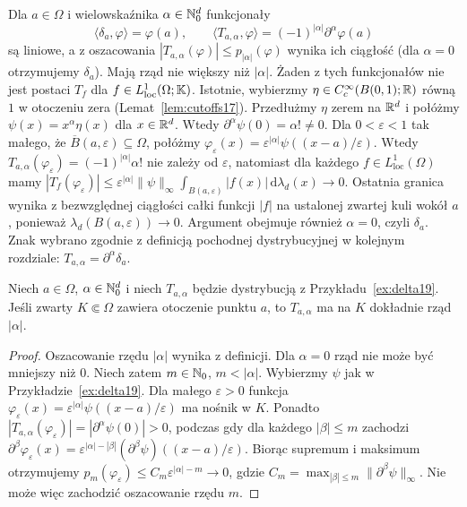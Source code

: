 \begin{przyklad}
\label{ex:delta19}
Dla $a\in\Omega$ i wielowskaźnika $\alpha\in\mathbb N_0^d$
funkcjonały
\[\langle\delta_a,\varphi\rangle=\varphi(a),\qquad
\langle T_{a,\alpha},\varphi\rangle
=(-1)^{|\alpha|}\partial^\alpha\varphi(a)\]
są liniowe, a z oszacowania
$|T_{a,\alpha}(\varphi)|\le p_{|\alpha|}(\varphi)$
wynika ich ciągłość (dla $\alpha=0$ otrzymujemy $\delta_a$).
Mają rząd nie większy niż $|\alpha|$.
Żaden z tych funkcjonałów nie jest postaci $T_f$
dla $f\in L^1_{\mathrm{loc}}(\Omega;\mathbb K)$.
Istotnie, wybierzmy $\eta\in C_c^\infty(B(0,1);\mathbb R)$
równą $1$ w otoczeniu zera (Lemat~\ref{lem:cutoffs17}).
Przedłużmy $\eta$ zerem na $\mathbb R^d$ i połóżmy
$\psi(x)=x^\alpha\eta(x)$ dla $x\in\mathbb R^d$.
Wtedy $\partial^\alpha\psi(0)=\alpha!\ne0$.
Dla $0<\varepsilon<1$ tak małego, że
$\overline B(a,\varepsilon)\subseteq\Omega$, połóżmy
$\varphi_\varepsilon(x)=\varepsilon^{|\alpha|}
\psi((x-a)/\varepsilon)$. Wtedy
$T_{a,\alpha}(\varphi_\varepsilon)=(-1)^{|\alpha|}\alpha!$
nie zależy od $\varepsilon$, natomiast dla każdego
$f\in L^1_{\mathrm{loc}}(\Omega)$ mamy
$|T_f(\varphi_\varepsilon)|\le
\varepsilon^{|\alpha|}\|\psi\|_\infty
\int_{B(a,\varepsilon)}|f(x)|\,\mathrm d\lambda_d(x)
\to0$.
Ostatnia granica wynika z bezwzględnej ciągłości całki
funkcji $|f|$ na ustalonej zwartej kuli wokół $a$,
ponieważ $\lambda_d(B(a,\varepsilon))\to0$.
Argument obejmuje również $\alpha=0$, czyli $\delta_a$.
Znak wybrano zgodnie z definicją
pochodnej dystrybucyjnej w kolejnym rozdziale:
$T_{a,\alpha}=\partial^\alpha\delta_a$.
\end{przyklad}

\begin{stwierdzenie}
\label{prop:delta-order19}
Niech $a\in\Omega$, $\alpha\in\mathbb N_0^d$ i niech
$T_{a,\alpha}$ będzie dystrybucją z Przykładu~\ref{ex:delta19}.
Jeśli zwarty $K\Subset\Omega$ zawiera otoczenie punktu $a$,
to $T_{a,\alpha}$ ma na $K$ dokładnie rząd $|\alpha|$.
\end{stwierdzenie}
\begin{proof}
Oszacowanie rzędu $|\alpha|$ wynika z definicji.
Dla $\alpha=0$ rząd nie może być mniejszy niż $0$.
Niech zatem $m\in\mathbb N_0$, $m<|\alpha|$.
Wybierzmy $\psi$ jak w Przykładzie~\ref{ex:delta19}.
Dla małego $\varepsilon>0$ funkcja
$\varphi_\varepsilon(x)=\varepsilon^{|\alpha|}
\psi((x-a)/\varepsilon)$ ma nośnik w $K$. Ponadto
$|T_{a,\alpha}(\varphi_\varepsilon)|
=|\partial^\alpha\psi(0)|>0$, podczas gdy
dla każdego $|\beta|\le m$ zachodzi
$\partial^\beta\varphi_\varepsilon(x)=
\varepsilon^{|\alpha|-|\beta|}(\partial^\beta\psi)((x-a)/\varepsilon)$.
Biorąc supremum i maksimum otrzymujemy
$p_m(\varphi_\varepsilon)\le C_m\varepsilon^{|\alpha|-m}
\to0$, gdzie $C_m=\max_{|\beta|\le m}\|\partial^\beta\psi\|_\infty$.
Nie może więc zachodzić oszacowanie rzędu $m$.
\end{proof}

